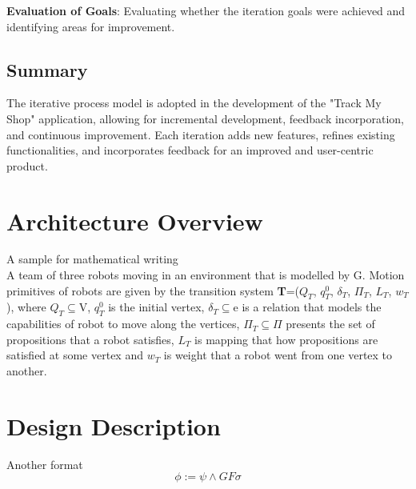 \textbf{Evaluation of Goals}:
Evaluating whether the iteration goals were achieved and identifying areas for improvement.

\subsection{Summary}

The iterative process model is adopted in the development of the "Track My Shop" application, allowing for incremental development, feedback incorporation, and continuous improvement. Each iteration adds new features, refines existing functionalities, and incorporates feedback for an improved and user-centric product.






\section{Architecture Overview}

A sample for mathematical writing\\ 

A team of three robots moving in an environment that is modelled by G. Motion primitives of robots are given by the transition system \textbf{T}=($Q_T$, $q^0_T$, $\delta_T$, $\Pi_T$, $L_T$, $w_T$), where $Q_T$$\subseteq$V, $q^0_T$ is the initial vertex, $\delta_T$$\subseteq$e is a relation that models the capabilities of robot to move along the vertices, $\Pi_T$$\subseteq$$\Pi$ presents the set of propositions that a robot satisfies, $L_T$ is mapping that how propositions are satisfied at some vertex and $w_T$ is weight that a robot went from one vertex to another.

\section{Design Description}
Another format 
\begin{equation}
    \phi := \psi \wedge GF \sigma
\end{equation}



